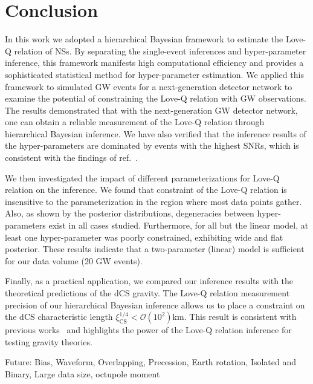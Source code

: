 \documentclass[a4paper,11pt]{article}
\begin{document}
\section{Conclusion}
\label{sec6}

In this work we adopted a hierarchical Bayesian framework to estimate the Love-Q relation of NSs. By separating the single-event inferences and hyper-parameter inference, this framework manifests high computational efficiency and provides a sophisticated statistical method for hyper-parameter estimation. We applied this framework to simulated GW events for a next-generation detector network to examine the potential of constraining the Love-Q relation with GW observations. The results demonstrated that with the next-generation GW detector network, one can obtain a reliable measurement of the Love-Q relation through hierarchical Bayesian inference. We have also verified that the inference results of the hyper-parameters are dominated by events with the highest SNRs, which is consistent with the findings of ref.~\cite{Lackey:2014fwa}.

We then investigated the impact of different parameterizations for Love-Q relation on the inference. We found that constraint of the Love-Q relation is insensitive to the parameterization in the region where most data points gather.
Also, as shown by the posterior distributions, degeneracies between hyper-parameters exist in all cases studied. Furthermore, for all but the linear model, at least one hyper-parameter was poorly constrained, exhibiting wide and flat posterior. These results indicate that a two-parameter (linear) model is sufficient for our data volume (20 GW events).

Finally, as a practical application, we compared our inference results with the theoretical predictions of the dCS gravity. The Love-Q relation measurement precision of our hierarchical Bayesian inference allows us to place a constraint on the dCS characteristic length $\xi_{\mathrm{CS}}^{1/4} < \mathcal{O}(10^2)$km. This result is consistent with previous works~\cite{Yagi:2013bca, Yagi:2013awa} and highlights the power of the Love-Q relation inference for testing gravity theories.

Future: Bias, Waveform, Overlapping, Precession, Earth rotation, Isolated and Binary, Large data size, octupole moment 

\acknowledgments

\clearpage


% 

\end{document}
